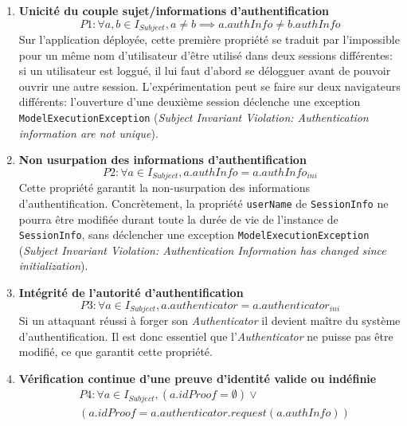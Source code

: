 \begin{enumerate}
    \item \textbf{Unicité du couple sujet/informations d'authentification}
    \begin{equation*}
        P1: \forall a, b \in I_{Subject}, a \ne b \implies a.authInfo \ne b.authInfo
    \end{equation*}
    Sur l'application déployée, cette première propriété se traduit par l'impossible pour un même nom d'utilisateur d'être utilisé dans deux sessions différentes: si un utilisateur est loggué, il lui faut d'abord se délogguer avant de pouvoir ouvrir une autre session. L'expérimentation peut se faire sur deux navigateurs différents: l'ouverture d'une deuxième session déclenche une exception \texttt{ModelExecutionException} (\textit{Subject Invariant Violation: Authentication information are not unique}). 
    \\
    \item \textbf{Non usurpation des informations d'authentification}
    \begin{equation*}
        P2: \forall a \in I_{Subject}, a.authInfo = a.authInfo_{ini}
    \end{equation*}
    Cette propriété garantit la non-usurpation des informations d'authentification. Concrètement, la propriété \texttt{userName} de \texttt{SessionInfo} ne pourra être modifiée durant toute la durée de vie de l'instance de \texttt{SessionInfo}, sans déclencher une exception \texttt{ModelExecutionException} (\textit{Subject Invariant Violation: Authentication Information has changed since initialization}). 
    \\
    \item \textbf{Intégrité de l'autorité d'authentification}
    \begin{equation*}
        P3: \forall a \in I_{Subject}, a.authenticator = a.authenticator_{ini}
    \end{equation*}
    Si un attaquant réussi à forger son \textit{Authenticator} il devient maître du système d'authentification. Il est donc essentiel que l'\textit{Authenticator} ne puisse pas être modifié, ce que garantit cette propriété.
    \\
    \item \textbf{Vérification continue d'une preuve d'identité valide ou indéfinie}
    \begin{equation*}
      \begin{split}
        &P4: \forall a \in I_{Subject}, (a.idProof = \emptyset) \lor \\&(a.idProof = a.authenticator.request(a.authInfo))

\end{split}
\end{equation*}
\end{enumerate}
